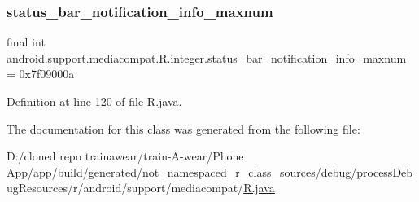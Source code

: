 \subsubsection{\texorpdfstring{status\_bar\_notification\_info\_maxnum}{status\_bar\_notification\_info\_maxnum}}
{\footnotesize\ttfamily final int android.\+support.\+mediacompat.\+R.\+integer.\+status\+\_\+bar\+\_\+notification\+\_\+info\+\_\+maxnum = 0x7f09000a\hspace{0.3cm}{\ttfamily [static]}}



Definition at line 120 of file R.\+java.



The documentation for this class was generated from the following file\+:\begin{DoxyCompactItemize}
\item 
D\+:/cloned repo trainawear/train-\/\+A-\/wear/\+Phone App/app/build/generated/not\+\_\+namespaced\+\_\+r\+\_\+class\+\_\+sources/debug/process\+Debug\+Resources/r/android/support/mediacompat/\mbox{\hyperlink{process_debug_resources_2r_2android_2support_2mediacompat_2_r_8java}{R.\+java}}\end{DoxyCompactItemize}
